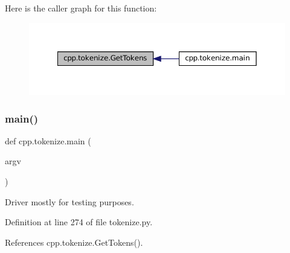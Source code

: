 Here is the caller graph for this function\+:
\nopagebreak
\begin{figure}[H]
\begin{center}
\leavevmode
\includegraphics[width=350pt]{namespacecpp_1_1tokenize_ab78959b4d0a9c3bade98904a23129afc_icgraph}
\end{center}
\end{figure}
\mbox{\label{namespacecpp_1_1tokenize_ae666c331b4bd7d1f3e8956c78cc6f3a4}} 
\subsubsection{\texorpdfstring{main()}{main()}}
{\footnotesize\ttfamily def cpp.\+tokenize.\+main (\begin{DoxyParamCaption}\item[{}]{argv }\end{DoxyParamCaption})}

\begin{DoxyVerb}Driver mostly for testing purposes.\end{DoxyVerb}
 

Definition at line 274 of file tokenize.\+py.



References cpp.\+tokenize.\+Get\+Tokens().


